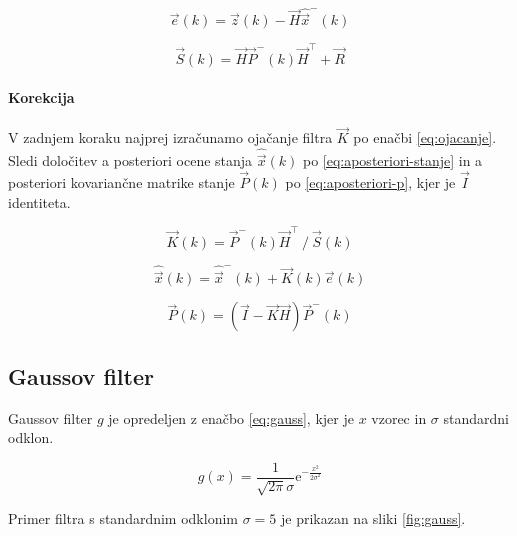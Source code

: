{\begin{equation}
	\vec{e}(k) = \vec{z}(k) - \vec{H} \hat{\vec{x}}^-(k)
    \label{eq:napaka}
\end{equation}

\begin{equation}
\vec{S}(k) = \vec{H} \vec{P}^-(k) \vec{H}^\top + \vec{R}
\label{eq:kovarianca-inovacije}
\end{equation}

\paragraph{Korekcija}
V zadnjem koraku najprej izračunamo ojačanje filtra $\vec{K}$ po enačbi \eqref{eq:ojacanje}. Sledi določitev a posteriori ocene stanja $\hat{\vec{x}}(k)$ po \eqref{eq:aposteriori-stanje} in a posteriori kovariančne matrike stanje $\vec{P}(k)$ po \eqref{eq:aposteriori-p}, kjer je $\vec{I}$ identiteta.

\begin{equation}
\vec{K}(k) = {\vec{P}^-(k) \vec{H}^\top} ~/~ {\vec{S}(k)}
\label{eq:ojacanje}
\end{equation}

\begin{equation}
\hat{\vec{x}}(k) = \hat{\vec{x}}^-(k) + \vec{K}(k) \vec{e}(k)
\label{eq:aposteriori-stanje}
\end{equation}

\begin{equation}
\vec{P}(k) = \left( \vec{I} - \vec{K} \vec{H} \right) \vec{P}^-(k)
\label{eq:aposteriori-p}
\end{equation}








\subsection{Gaussov filter}\label{sec:gaussov-filter}
Gaussov filter $g$ je opredeljen z enačbo \eqref{eq:gauss}, kjer je $x$ vzorec in $\sigma$ standardni odklon. 


\begin{equation}
g(x) = \frac{1}{\sqrt{2 \pi} \sigma} \mathrm{e}^{-\frac{x^2}{2 \sigma^2}} 
\label{eq:gauss}
\end{equation}


Primer filtra s standardnim odklonim $\sigma = 5$ je prikazan na sliki \ref{fig:gauss}.

}
